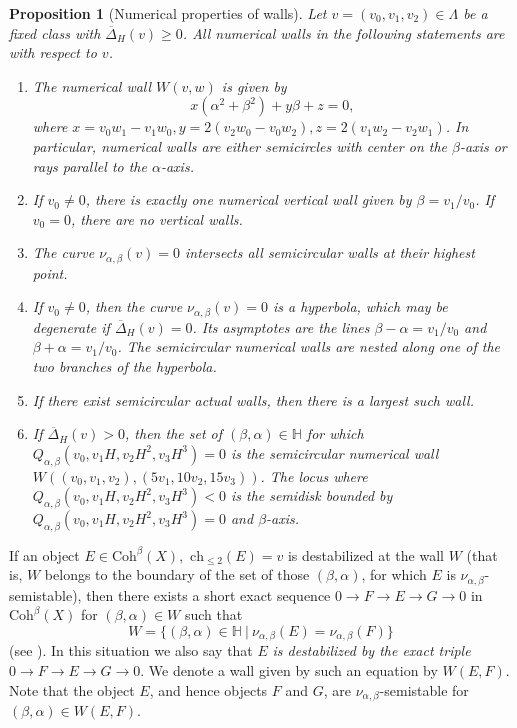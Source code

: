 \documentclass{amsart}
\newtheorem{proposition}[theorem]{Proposition}
\begin{document}
	\begin{proposition}[Numerical properties of walls]\label{numerical} Let $v=(v_0,v_1,v_2)\in\Lambda$ be a fixed class with $\overline{\Delta}_H(v)\ge 0$. All numerical walls in the following statements are with respect to $v$.
		\begin{enumerate} 
			\item The numerical wall $W(v,w)$ is given by
			$$x(\alpha^2+\beta^2)+y\beta+z=0,$$
			where $x=v_0w_1-v_1w_0,y=2(v_2w_0-v_0w_2),z=2(v_1w_2-v_2w_1)$. In particular, numerical walls are either semicircles with center on the $\beta$-axis or rays parallel to the $\alpha$-axis. 
			\item If $v_0\neq 0$, there is exactly one numerical vertical wall given by $\beta = v_1/v_0$. If $v_0 = 0$, there are no vertical walls.
			\item The curve $\nu_{\alpha, \beta}(v) = 0$ intersects all semicircular walls at their highest point.
			\item If $v_0\neq 0$, then the curve $\nu_{\alpha, \beta}(v) = 0$ is a hyperbola, which may be degenerate if $\overline{\Delta}_H(v)=0$. Its asymptotes are the lines $\beta-\alpha=v_1/v_0$ and $\beta+\alpha=v_1/v_0$. The semicircular numerical walls are nested along one of the two branches of the hyperbola. 
			\item If there exist semicircular actual walls, then there is a largest such wall.
			\item If $\overline{\Delta}_H(v)>0$, then the set of $(\beta,\alpha)\in\mathbb H$ for which $Q_{\alpha,\beta}(v_0,v_1H,v_2H^2,v_3H^3)=0$ is the semicircular numerical wall $W((v_0,v_1,v_2),(5v_1,10v_2,15v_3))$. The locus where $Q_{\alpha,\beta}(v_0,v_1H,v_2H^2,v_3H^3)<0$ is the semidisk bounded by\linebreak $Q_{\alpha,\beta}(v_0,v_1H,v_2H^2,v_3H^3)=0$ and $\beta$-axis.
		\end{enumerate}
	\end{proposition}
	
	If an object $E\in\mathrm{Coh}^\beta(X),$ $\mathrm{ch}_{\le 2}(E)=v$ is destabilized at the wall $W$ (that is, $W$ belongs to the boundary of the set of those $(\beta,\alpha)$, for which $E$ is $\nu_{\alpha,\beta}$-semistable), 
	then there exists a short exact sequence $0\to F\to E\to G\to 0$ in $\mathrm{Coh}^\beta(X)$ for $(\beta,\alpha)\in W$ such that $$W=\{(\beta,\alpha)\in\mathbb H\ |\ \nu_{\alpha,\beta}(E)=\nu_{\alpha,\beta}(F)\}$$ (see \cite[Proposition B.5]{BMS16}). In this situation we also say that $E$ \textit{is destabilized by the exact triple} $0\to F\to E\to G\to 0$. We denote a wall given by such an equation by $W(E,F)$. Note that the object $E$, and hence objects $F$ and $G$, are $\nu_{\alpha,\beta}$-semistable for $(\beta,\alpha)\in W(E,F)$. 
	
\end{document}
